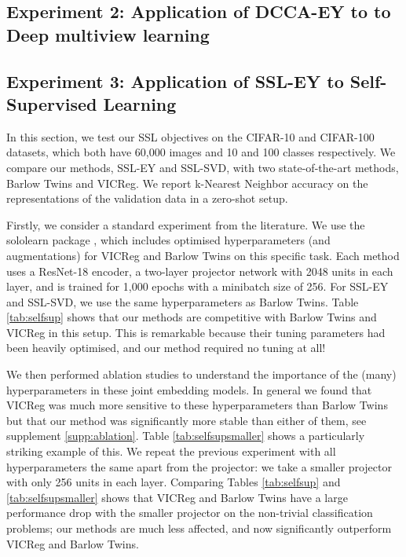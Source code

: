 \subsection{Experiment 2: Application of DCCA-EY to to Deep multiview learning}

\subsection{Experiment 3: Application of SSL-EY to Self-Supervised Learning}

In this section, we test our SSL objectives on the CIFAR-10 and CIFAR-100 datasets, which both have 60,000 images and 10 and 100 classes respectively. We compare our methods, SSL-EY and SSL-SVD, with two state-of-the-art methods, Barlow Twins and VICReg. We report k-Nearest Neighbor accuracy on the representations of the validation data in a zero-shot setup.

Firstly, we consider a standard experiment from the literature.
We use the sololearn package \cite{da2022solo}, which includes optimised hyperparameters (and augmentations) for VICReg and Barlow Twins on this specific task.
Each method uses a ResNet-18 encoder, a two-layer projector network with 2048 units in each layer, and is trained for 1,000 epochs with a minibatch size of 256.
For SSL-EY and SSL-SVD, we use the same hyperparameters as Barlow Twins.  
Table \ref{tab:selfsup} shows that our methods are competitive with Barlow Twins and VICReg in this setup.
This is remarkable because their tuning parameters had been heavily optimised, and our method required no tuning at all!

We then performed ablation studies to understand the importance of the (many) hyperparameters in these joint embedding models. In general we found that VICReg was much more sensitive to these hyperparameters than Barlow Twins but that our method was significantly more stable than either of them, see supplement \ref{supp:ablation}.
Table \ref{tab:selfsupsmaller} shows a particularly striking example of this. 
We repeat the previous experiment with all hyperparameters the same apart from the projector: we take a smaller projector with only 256 units in each layer. 
Comparing Tables \ref{tab:selfsup} and \ref{tab:selfsupsmaller} shows that VICReg and Barlow Twins have a large performance drop with the smaller projector on the non-trivial classification problems; our methods are much less affected, and now significantly outperform VICReg and Barlow Twins.
 

